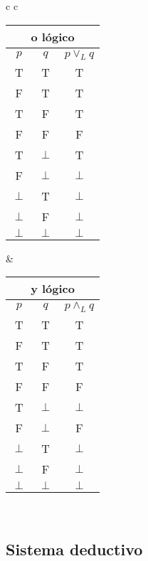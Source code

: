 \documentclass{article}
\begin{document}
\begin{center}
\begin{tabular}{c c}

	\begin{tabular}{|c|c|c|}
		\multicolumn{3}{c}{\textbf{o lógico}} \\

		\hline
		$p$ & $q$ & $p \lor_{L} q$\\
		\hline
    	T & T & T\\
		\hline
    	F & T & T\\
    	\hline
    	T & F & T\\
    	\hline
    	F & F & F\\
    	\hline
    	T & $\perp$ & T\\
		\hline
    	F & $\perp$ & $\perp$\\
    	\hline
    	$\perp$ & T & $\perp$\\
    	\hline
    	$\perp$ & F & $\perp$\\
	    \hline
   		$\perp$ & $\perp$ & $\perp$\\
    	\hline
	\end{tabular}

&

	\begin{tabular}{|c|c|c|}
		\multicolumn{3}{c}{\textbf{y lógico}} \\

		\hline
		$p$ & $q$ & $p \land_{L} q$\\
		\hline
    	T & T & T\\
		\hline
    	F & T & T\\
    	\hline
    	T & F & T\\
    	\hline
    	F & F & F\\
    	\hline
    	T & $\perp$ & $\perp$\\
		\hline
    	F & $\perp$ & F\\
    	\hline
    	$\perp$ & T & $\perp$\\
    	\hline
    	$\perp$ & F & $\perp$\\
    	\hline
	    $\perp$ & $\perp$ & $\perp$\\
    	\hline
	\end{tabular} \\

\end{tabular}
\end{center}

\subsection{Sistema deductivo}
\end{document}
